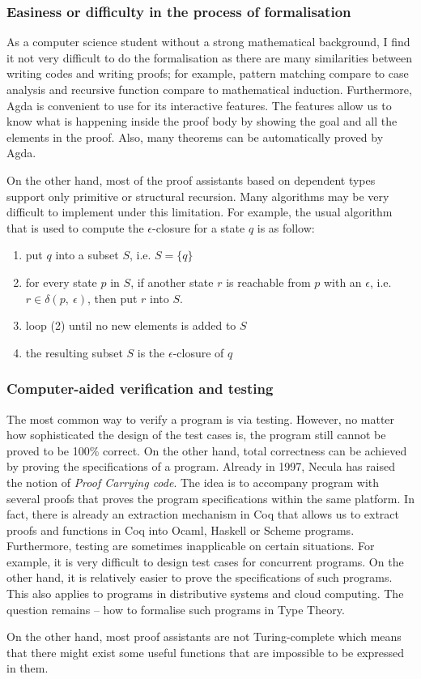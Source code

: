 \subsubsection{Easiness or difficulty in the process of formalisation}
\par As a computer science student without a strong mathematical
background, I find it not very difficult to do the
formalisation as there are many similarities between writing codes and writing
proofs; for example, pattern matching compare to case analysis and
recursive function compare to mathematical induction. Furthermore, Agda is convenient
to use for its interactive features. The features allow us to know
what is happening inside the proof body by showing the goal and all the
elements in the proof. Also, many theorems can be automatically proved
by Agda. 
\par On the other hand, most of the
proof assistants based on dependent types support only primitive or
structural recursion. Many algorithms may be very difficult to
implement under this limitation. For example, the usual algorithm that
is used to compute the \(\epsilon\)-closure for a state \(q\) is as follow:
\begin{enumerate}[nolistsep]
  \item put \(q\) into a subset \(S\), i.e. \(S = \{q\}\)
  \item for every state \(p\) in \(S\), if another state \(r\) is
    reachable from \(p\) with an \(\epsilon\), i.e. \(r \in
        \delta (p,\ \epsilon)\), then put \(r\) into \(S\). 
  \item loop (2) until no new elements is added to \(S\)
  \item the resulting subset \(S\) is the $\epsilon$-closure of \(q\)
\end{enumerate}

\par 


\subsubsection{Computer-aided verification and testing}
\par The most common way to verify a program is via testing. However,
no matter how sophisticated the design of the test cases is, the
program still cannot be proved to be 100\% correct. On the other
hand, total correctness can be achieved by proving the specifications
of a program. Already in 1997, Necula \cite{necula1997} has raised the
notion of \textit{Proof Carrying code}. The idea is to accompany
program with several proofs that proves the program specifications
within the same platform. In fact, there is already an
extraction mechanism \cite{letouzey2008} in Coq that allows us to
extract proofs and functions in Coq into Ocaml, Haskell or Scheme
programs. Furthermore, testing are sometimes inapplicable on certain
situations. For example, it is very difficult to design test cases for
concurrent programs. On the other hand, it is relatively easier to prove the
specifications of such programs. This also applies to programs in
distributive systems and cloud computing. The question remains -- how
to formalise such programs in Type Theory. 

\par On the other hand, most proof assistants are not Turing-complete
which means that there might exist some useful functions that are
impossible to be expressed in them. 